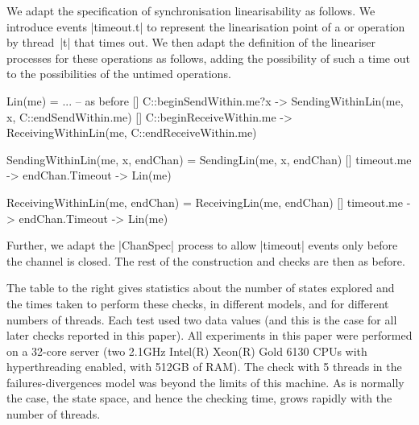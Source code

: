 
\inlineCSP

We adapt the specification of synchronisation linearisability as follows.  We
introduce events |timeout.t| to represent the linearisation point of a
 or  operation by thread~|t| that times
out.  We then adapt the definition of the lineariser processes for these
operations as follows, adding the possibility of such a time out to the
possibilities of the untimed operations.
%
\begin{cspm}
Lin(me) = 
  ... -- as before
  [] C::beginSendWithin.me?x -> SendingWithinLin(me, x, C::endSendWithin.me)
  [] C::beginReceiveWithin.me -> ReceivingWithinLin(me, C::endReceiveWithin.me)

SendingWithinLin(me, x, endChan) = 
  SendingLin(me, x, endChan)
  [] timeout.me -> endChan.Timeout -> Lin(me)

ReceivingWithinLin(me, endChan) = 
  ReceivingLin(me, endChan) 
  [] timeout.me -> endChan.Timeout -> Lin(me)
\end{cspm}
%
Further, we adapt the |ChanSpec| process to allow |timeout| events only before
the channel is closed.  The rest of the construction and checks are then as
before. 

%
The table to the right gives statistics about the number of states explored
and the times taken to perform these checks, in different models, and for
different numbers of threads.  Each test used two data values (and this is the
case for all later checks reported in this paper).  All
experiments in this paper were performed on a 32-core server (two 2.1GHz
Intel(R) Xeon(R) Gold 6130 CPUs with hyperthreading enabled, with 512GB of
RAM).  The check with 5 threads in the failures-divergences model was beyond
the limits of this machine.  As is normally the case, the state space, and
hence the checking time, grows rapidly with the number of threads.   
\end{window}
